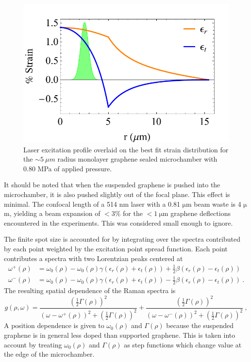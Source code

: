 \begin{figure}
	\begin{center}
	\includegraphics{Figs_Fit/SB02-1_StrainWithLaser.pdf}
	\caption[Laser excitation profile overlaid on strain distribution]{\label{Fig:Fit:FiniteSpot}Laser excitation profile overlaid on the best fit strain distribution for the $\sim 5 \ \mu m$ radius monolayer graphene sealed microchamber with 0.80 MPa of applied pressure.}
	\end{center}
\end{figure}

It should be noted that when the suspended graphene is pushed into the microchamber, it is also pushed slightly out of the focal plane.
This effect is minimal.
The confocal length of a 514 nm laser with a 0.81 $\mathrm{\mu}$m beam waste is 4 $\mathrm{\mu}$m, yielding a beam expansion of $<3\%$ for the $<1 \ \mathrm{\mu m}$ graphene deflections encountered in the experiments.
This was considered small enough to ignore.

The finite spot size is accounted for by integrating over the spectra contributed by each point weighted by the excitation point spread function.
Each point contributes a spectra with two Lorentzian peaks centered at
\begin{align*}
	\omega^+ (\rho)&=\omega_0(\rho)-\omega_0(\rho) \gamma(\epsilon_{r}(\rho)+\epsilon_{t}(\rho)) 
		+ \frac{1}{2} \beta (\epsilon_{r}(\rho)-\epsilon_{t}(\rho)) \\
	\omega^-(\rho)&=\omega_0(\rho)-\omega_0(\rho) \gamma(\epsilon_{r}(\rho)+\epsilon_{t}(\rho))
		- \frac{1}{2} \beta (\epsilon_{r}(\rho)-\epsilon_{t}(\rho)) \ .
\end{align*}
The resulting spatial dependence of the Raman spectra is
\begin{equation*}
	g(\rho,\omega)=
	\frac{\left(\frac{1}{2} \Gamma(\rho) \right)^2}
	{\left(\omega-\omega^+(\rho) \right)^2+\left(\frac{1}{2} \Gamma(\rho) \right)^2}+
	\frac{\left(\frac{1}{2} \Gamma(\rho) \right)^2}
	{\left(\omega-\omega^-(\rho) \right)^2+\left(\frac{1}{2} \Gamma(\rho) \right)^2} \ ,
\end{equation*}
A position dependence is given to $\omega_0(\rho)$ and $\Gamma(\rho)$ because the suspended graphene is in general less doped than supported graphene.
This is taken into account by treating $\omega_0(\rho)$ and $\Gamma(\rho)$ as step functions which change value at the edge of the microchamber.

